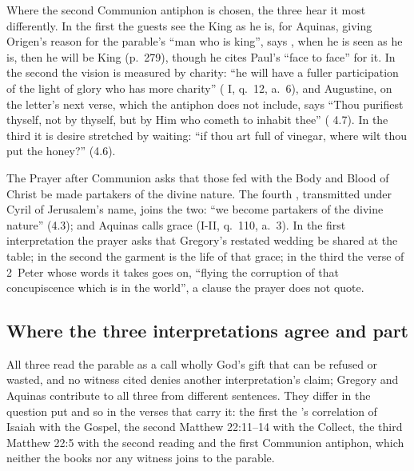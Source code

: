 Where the second Communion antiphon is chosen, the three hear it most
differently. In the first the guests see the King as he is, for Aquinas,
giving Origen's reason for the parable's ``man who is king'', says , when he is seen as he is, then he will
be King (p.~279), though he cites Paul's ``face to face'' for it. In the
second the vision is measured by charity: ``he will have a fuller
participation of the light of glory who has more charity'' ( I, q.~12, a.~6), and Augustine, on the letter's next verse, which
the antiphon does not include, says ``Thou purifiest thyself, not by thyself,
but by Him who cometh to inhabit thee'' ( 4.7). In the third it is desire stretched by waiting: ``if thou art full
of vinegar, where wilt thou put the honey?'' (4.6).

The Prayer after Communion asks that those fed with the Body and Blood of
Christ be made partakers of the divine nature. The fourth , transmitted under Cyril of Jerusalem's name, joins the two:
``we become partakers of the divine nature'' (4.3); and Aquinas calls grace
 (I-II, q.~110, a.~3). In the first
interpretation the prayer asks that Gregory's restated wedding be shared at
the table; in the second the garment is the life of that grace; in the third
the verse of 2~Peter whose words it takes goes on, ``flying the corruption of
that concupiscence which is in the world'', a clause the prayer does not
quote.

\subsection{Where the three interpretations agree and part}

All three read the parable as a call wholly God's gift that can be refused or
wasted, and no witness cited denies another interpretation's claim; Gregory and Aquinas
contribute to all three from different sentences. They differ in the question put and so
in the verses that carry it: the first the 's correlation of
Isaiah with the Gospel, the second Matthew 22:11--14 with the Collect, the
third Matthew 22:5 with the second reading and the first Communion antiphon,
which neither the books nor any witness joins to the parable.

